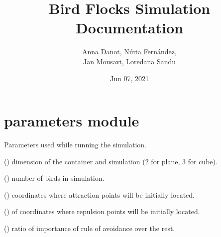 \documentclass[a4paper,11pt,oneside,english]{sphinxmanual}
\title{Bird Flocks Simulation\\
  \LARGE Documentation}
\date{Jun 07, 2021}
\author{Anna Danot, Núria Fernández,\\ Jan Mousavi, Loredana Sandu}
\begin{document}
\pagestyle{empty}
\sphinxmaketitle
\pagestyle{plain}
\sphinxtableofcontents
\pagestyle{normal}
\label{\detokenize{index::doc}}

\chapter{parameters module}
\label{\detokenize{parameters:module-parameters}}\label{\detokenize{parameters:parameters-module}}\label{\detokenize{parameters::doc}}\label{\detokenize{parameters:module-0}}
Parameters used while running the simulation.

\bigskip 
\bigskip 

\begin{fulllineitems}
() dimension of the container and simulation (2 for plane, 3 for cube).

\end{fulllineitems}



\begin{fulllineitems}
() number of birds in simulation.

\end{fulllineitems}

\bigskip
\bigskip 

\begin{fulllineitems}
() coordinates where attraction points will be initially located.

\end{fulllineitems}



\begin{fulllineitems}
() of coordinates where repulsion points will be initially located.

\end{fulllineitems}


\bigskip
\bigskip 


\begin{fulllineitems}
() ratio of importance of rule of avoidance over the rest.

\end{fulllineitems}
\end{document}
